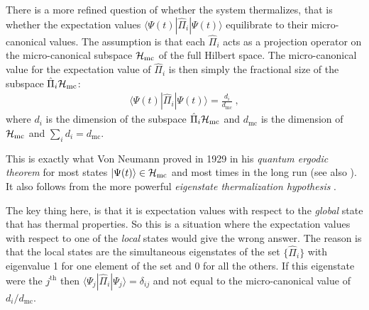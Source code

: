 \documentclass[12pt]{article}
\theoremstyle{plain}
\theoremstyle{definition}
\theoremstyle{remark}
\def\BH{{\cal H}}
\def\bra#1{\langle #1|}
\def\ket#1{| #1\rangle}
\newcommand{\EQ}[1]{\begin{equation}\begin{split} #1
\end{split}\end{equation}}
\begin{document}
There is a more refined question of whether the system thermalizes, that is whether 
the expectation values $\bra{\Psi(t)}\hat\Pi_i\ket{\Psi(t)}$ equilibrate to their micro-canonical values. 
The assumption is that each $\hat\Pi_i$ acts as a projection operator on the micro-canonical subspace $\BH_\text{mc}$ of the full Hilbert space. The micro-canonical value for the expectation value of $\hat\Pi_i$ is then simply the fractional size of the subspace $\hat\Pi_i\BH_\text{mc}$:
\EQ{
\bra{\Psi(t)}\hat\Pi_i\ket{\Psi(t)}=\frac{d_i}{d_\text{mc}}\ ,
\label{nxx}
}
where $d_i$ is the dimension of the subspace $\hat\Pi_i{\cal H}_\text{mc}$ and $d_\text{mc}$ is the dimension of ${\cal H}_\text{mc}$ and $\sum_id_i=d_\text{mc}$. 
 
This is exactly what Von Neumann proved in 1929 in his {\it quantum ergodic theorem\/} \cite{vN} for most states $\ket{\Psi(t)}\in\BH_\text{mc}$ and most times in the long run (see also \cite{GLMTZ}). It also follows from the more powerful {\it eigenstate thermalization hypothesis\/} \cite{Srednicki2}.
 
The key thing here, is that it is expectation values with respect to the {\it global\/} state that has thermal properties. 
So this is a situation where the expectation values with respect to one of the {\it local\/} states would give the wrong answer. The reason is that the local states are the simultaneous eigenstates of the set $\{\hat\Pi_i\}$ with eigenvalue 1 for one element of the set and 0 for all the others. If this eigenstate were the $j^\text{th}$ then $\bra{\Psi_j}\hat\Pi_i\ket{\Psi_j}=\delta_{ij}$ and not equal to the micro-canonical value of $d_i/d_\text{mc}$.
\end{document}
